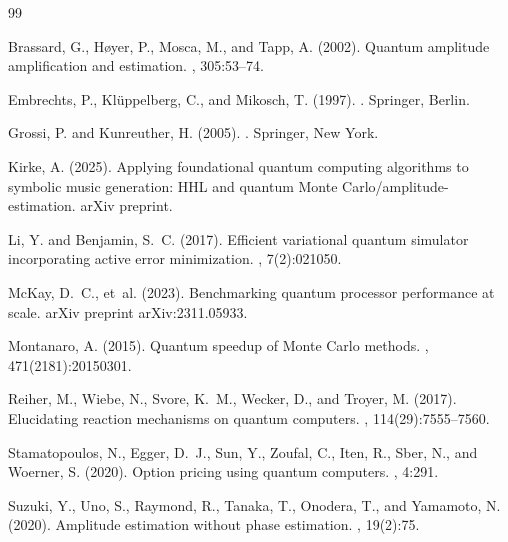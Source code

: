\documentclass[11pt,a4paper]{article}
\begin{document}

\begin{thebibliography}{99}

Brassard, G., H{\o}yer, P., Mosca, M., and Tapp, A. (2002).
\newblock Quantum amplitude amplification and estimation.
, 305:53--74.

Embrechts, P., Kl\"{u}ppelberg, C., and Mikosch, T. (1997).
.
\newblock Springer, Berlin.

Grossi, P. and Kunreuther, H. (2005).
.
\newblock Springer, New York.

Kirke, A. (2025).
\newblock Applying foundational quantum computing algorithms to symbolic music generation: HHL and quantum Monte Carlo/amplitude-estimation.
\newblock arXiv preprint.

Li, Y. and Benjamin, S.~C. (2017).
\newblock Efficient variational quantum simulator incorporating active error minimization.
, 7(2):021050.

McKay, D.~C., et~al. (2023).
\newblock Benchmarking quantum processor performance at scale.
\newblock arXiv preprint arXiv:2311.05933.

Montanaro, A. (2015).
\newblock Quantum speedup of Monte Carlo methods.
, 471(2181):20150301.

Reiher, M., Wiebe, N., Svore, K.~M., Wecker, D., and Troyer, M. (2017).
\newblock Elucidating reaction mechanisms on quantum computers.
, 114(29):7555--7560.

Stamatopoulos, N., Egger, D.~J., Sun, Y., Zoufal, C., Iten, R., Sber, N., and Woerner, S. (2020).
\newblock Option pricing using quantum computers.
, 4:291.

Suzuki, Y., Uno, S., Raymond, R., Tanaka, T., Onodera, T., and Yamamoto, N. (2020).
\newblock Amplitude estimation without phase estimation.
, 19(2):75.


\end{thebibliography}
\end{document}
